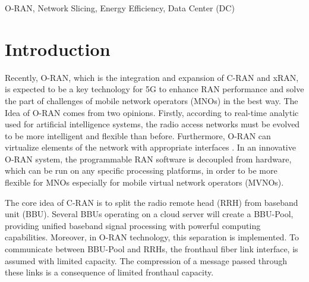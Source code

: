\documentclass[conference]{IEEEtran}
\begin{document}
\begin{IEEEkeywords}
O-RAN, Network Slicing, Energy Efficiency, Data Center (DC)
\end{IEEEkeywords}

\section{Introduction}
Recently, O-RAN, which is the integration and expansion of C-RAN and xRAN, is expected to be a key technology for 5G to enhance RAN performance and solve the part of challenges of mobile network operators (MNOs) in the best way.  
The Idea of O-RAN comes from two opinions. Firstly, according to real-time analytic used for artificial intelligence systems, the radio access networks must be evolved to be more intelligent and flexible than before. Furthermore, O-RAN can virtualize elements of the network with  appropriate interfaces \cite{orant}.
In an innovative O-RAN system, the programmable RAN software is decoupled from hardware, which can be run on any specific processing platforms, in order to be more flexible for MNOs especially for mobile virtual network operators (MVNOs)\cite{oran1}. 


The core idea of C-RAN is to split the radio remote head (RRH) from baseband unit (BBU). Several BBUs operating on a cloud server will create a BBU-Pool, providing unified baseband signal processing with powerful computing capabilities. Moreover, in O-RAN technology, this separation is implemented\cite{cran1}.
To communicate between BBU-Pool and RRHs, the fronthaul fiber link interface, is assumed with limited capacity. The compression of a message passed through these links is a consequence of limited fronthaul capacity\cite{frdl,simeone2016cloud,motalleb2017optimal}.
\end{document}
